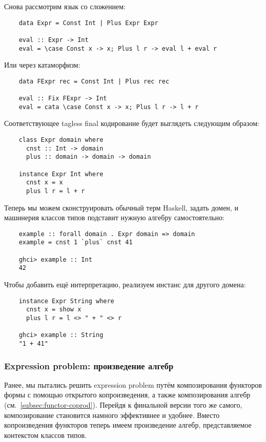 Снова рассмотрим язык со сложением:
\begin{verbatim}
    data Expr = Const Int | Plus Expr Expr

    eval :: Expr -> Int
    eval = \case Const x -> x; Plus l r -> eval l + eval r
\end{verbatim}
Или через катаморфизм:
\begin{verbatim}
    data FExpr rec = Const Int | Plus rec rec

    eval :: Fix FExpr -> Int
    eval = cata \case Const x -> x; Plus l r -> l + r
\end{verbatim}
Соответствующее tagless final кодирование будет выглядеть следующим образом:
\begin{verbatim}
    class Expr domain where
      cnst :: Int -> domain
      plus :: domain -> domain -> domain

    instance Expr Int where
      cnst x = x
      plus l r = l + r
\end{verbatim}

Теперь мы можем сконструировать обычный терм Haskell, задать домен, и машинерия классов типов подставит нужную алгебру самостоятельно:
\begin{verbatim}
    example :: forall domain . Expr domain => domain
    example = cnst 1 `plus` cnst 41

    ghci> example :: Int
    42
\end{verbatim}

Чтобы добавить ещё интерпретацию, реализуем инстанс для другого домена:
\begin{verbatim}
    instance Expr String where
      cnst x = show x
      plus l r = l <> " + " <> r

    ghci> example :: String
    "1 + 41"
\end{verbatim}

\subsubsection{Expression problem: произведение алгебр}

Ранее, мы пытались решить expression problem путём композирования функторов формы с помощью открытого копроизведения, а также композирования алгебр (см.~\ref{subsec:functor-coprod}).
Перейдя к финальной версии того же самого, композирование становится намного эффективнее и удобнее.
Вместо копроизведения функторов теперь имеем произведение алгебр, представляемое контекстом классов типов.

